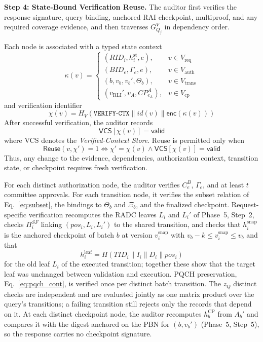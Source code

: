 \documentclass[lettersize,journal]{IEEEtran}
\begin{document}
\medskip
\noindent\textbf{Step 4: State-Bound Verification Reuse.}
The auditor first verifies the response signature, query binding,
anchored RAI checkpoint, multiproof, and any required coverage
evidence, and then traverses $G_{Q_j}^{V}$ in dependency order.

Each node is associated with a typed state context
\begin{equation}
\kappa(v)=
\begin{cases}
(RID_i,h_i^{\mathrm{st}},e),
&v\in V_{\mathrm{req}}\\
(BID_e,\Gamma_e,e),
&v\in V_{\mathrm{auth}}\\
(b,v_b,v_b',\Theta_b),
&v\in V_{\mathrm{trans}}\\
(v_{\mathrm{RLI}}',v_A,CP_{e_A}^A),
&v\in V_{\mathrm{cp}}
\end{cases}
\end{equation}
and verification identifier
\begin{equation}
\chi(v)=
H_V(
\texttt{VERIFY-CTX}\parallel
id(v)\parallel\mathsf{enc}(\kappa(v)))
\label{eq:chi}
\end{equation}
After successful verification, the auditor records
\begin{equation}
\mathsf{VCS}[\chi(v)]=\mathsf{valid}
\end{equation}
where VCS denotes the \emph{Verified-Context Store}. Reuse is permitted
only when
\begin{equation}
\mathsf{Reuse}(v,\chi')
=1
\Longleftrightarrow
\chi'=\chi(v)
\land
\mathsf{VCS}[\chi(v)]=\mathsf{valid}
\label{eq:saver_reuse}
\end{equation}
Thus, any change to the evidence, dependencies, authorization context,
transition state, or checkpoint requires fresh verification.

For each distinct authorization node, the auditor verifies $C_e^B$,
$\Gamma_e$, and at least $t$ committee approvals. For each transition
node, it verifies the subset relation of Eq.~\eqref{eq:subset}, the
bindings to $\Theta_b$ and $\Xi_b$, and the finalized checkpoint.
Request-specific verification recomputes the RADC leaves $L_i$ and
$L_i'$ of Phase~5, Step~2, checks $\Pi_i^{SF}$ linking
$(pos_i,L_i,L_i')$ to the shared transition, and checks that
$h_i^{\mathrm{snap}}$ is the anchored checkpoint of batch $b$ at version
$v_i^{\mathrm{snap}}$ with $v_b-k\le v_i^{\mathrm{snap}}\le v_b$ and that
\begin{equation}
h_i^{\mathrm{leaf}}=H(TID_i\parallel I_i\parallel D_i\parallel pos_i)
\end{equation}
for the old leaf $L_i$ of the executed transition;
together these show that the target leaf was unchanged between validation
and execution. PQCH preservation, Eq.~\eqref{eq:pqch_cont}, is
verified once per distinct batch transition.
The $z_Q$ distinct checks are independent and are
evaluated jointly as one matrix product over the query's transitions; a
failing transition still rejects only the records that depend on it. At
each distinct checkpoint node, the auditor recomputes $h_b^{\mathrm{CP}}$
from $A_b'$ and compares it with the digest anchored on the PBN for
$(b,v_b')$ (Phase~5, Step~5), so the response carries no checkpoint
signature.
\end{document}
